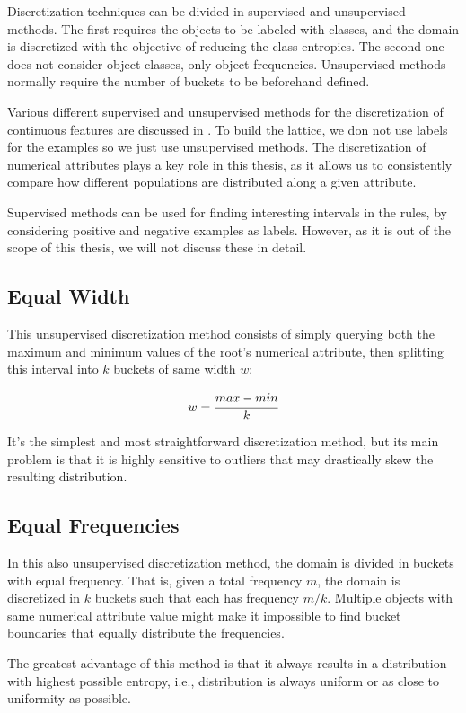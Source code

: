 Discretization techniques can be divided in supervised and unsupervised methods. The first requires the objects to
be labeled with classes, and the domain is discretized with the objective of reducing the class entropies. The second
one does not consider object classes, only object frequencies. Unsupervised methods normally require the number of
buckets to be beforehand defined.

Various different supervised and unsupervised methods for the discretization of continuous features are discussed in
\citet{Dougherty95supervisedand}. To build the lattice, we don not use labels for the examples so we just use
unsupervised methods. The discretization of numerical attributes plays a key role in this thesis, as it allows us to
consistently compare how different populations are distributed along a given attribute.

Supervised methods can be used for finding interesting intervals in the rules, by considering positive and negative
examples as labels. However, as it is out of the scope of this thesis, we will not discuss these in detail.

\subsection{Equal Width}
This unsupervised discretization method consists of simply querying both the maximum and minimum values of the root's
numerical attribute, then splitting this interval into $k$ buckets of same width $w$:

\begin{equation}
 w=\cfrac{max-min}{k}
\end{equation}

It's the simplest and most straightforward discretization method, but its main problem is that it is highly
sensitive to outliers that may drastically skew the resulting distribution.

\subsection{Equal Frequencies}
In this also unsupervised discretization method, the domain is divided in buckets with equal frequency. That is, given
a
total frequency $m$, the domain is discretized in $k$ buckets such that each has frequency $m/k$. Multiple
objects with same numerical attribute value might make it impossible to find bucket boundaries that equally
distribute the frequencies.

The greatest advantage of this method is that it always results in a distribution with highest possible entropy, i.e.,
distribution is always uniform or as close to uniformity as possible.

